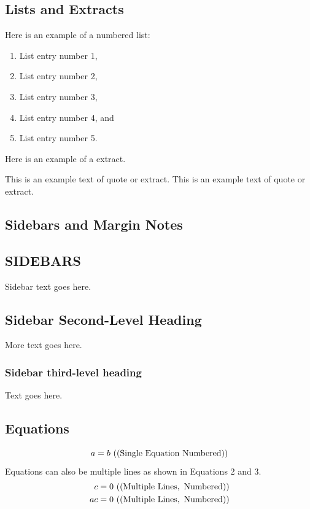 \documentclass{ar-1col}
\begin{document}
\subsection{Lists and Extracts} Here is an example of a numbered list:
\begin{enumerate}
\item List entry number 1,
\item List entry number 2,
\item List entry number 3,\item List entry number 4, and
\item List entry number 5.
\end{enumerate}

Here is an example of a extract.
\begin{extract}
This is an example text of quote or extract.
This is an example text of quote or extract.
\end{extract}

\subsection{Sidebars and Margin Notes}
\begin{marginnote}[]
\end{marginnote}

\begin{textbox}[h]\section{SIDEBARS}
Sidebar text goes here.
\subsection{Sidebar Second-Level Heading}
More text goes here.\subsubsection{Sidebar third-level heading}
Text goes here.\end{textbox}



\subsection{Equations}
\begin{equation}
a = b \ {\rm ((Single\ Equation\ Numbered))}
\end{equation}
Equations can also be multiple lines as shown in Equations 2 and 3.
\begin{eqnarray}
c = 0 \ {\rm ((Multiple\  Lines, \ Numbered))}\\
ac = 0 \ {\rm ((Multiple \ Lines, \ Numbered))}
\end{eqnarray}
\end{document}
